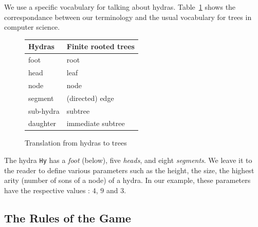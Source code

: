 We use a specific vocabulary for talking about hydras. Table~\ref{tab:hyd2tree} shows the correspondance between our terminology and the usual vocabulary for trees in computer science.


\begin{figure}[h]
  \centering
  \begin{tabular}{ll}
Hydras & Finite rooted trees\\
\hline
foot & root\\
head & leaf\\
node & node\\
segment  & (directed) edge \\
sub-hydra & subtree\\
daughter & immediate subtree\\
\end{tabular}
  \caption{Translation from hydras to trees}
  \label{tab:hyd2tree}
\end{figure}


The hydra \texttt{Hy} has a \emph{foot} (below), five \emph{heads}, and eight \emph{segments}. 
We leave it to the reader to define various parameters such as the height, the size, the highest arity (number of sons of a node) of a hydra. In our example, these parameters have the respective values : $4$, $9$ and $3$.




\subsection{The Rules of the Game}

\label{sec:orgheadline44}
\label{sect:replication-def}

